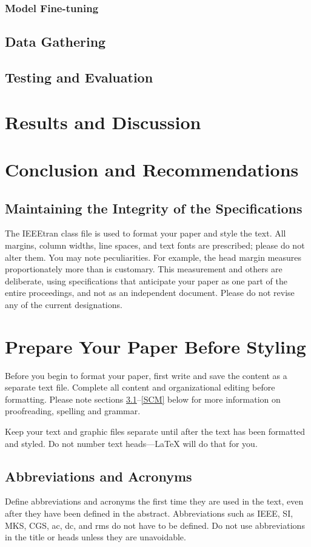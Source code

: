 \documentclass[conference]{IEEEtran}
\begin{document}
        \subsubsection{Model Fine-tuning}
    \subsection{Data Gathering}
    \subsection{Testing and Evaluation}

\section{Results and Discussion}
\section{Conclusion and Recommendations}

\subsection{Maintaining the Integrity of the Specifications}

The IEEEtran class file is used to format your paper and style the text. All margins, 
column widths, line spaces, and text fonts are prescribed; please do not 
alter them. You may note peculiarities. For example, the head margin
measures proportionately more than is customary. This measurement 
and others are deliberate, using specifications that anticipate your paper 
as one part of the entire proceedings, and not as an independent document. 
Please do not revise any of the current designations.

\section{Prepare Your Paper Before Styling}
Before you begin to format your paper, first write and save the content as a 
separate text file. Complete all content and organizational editing before 
formatting. Please note sections \ref{AA}--\ref{SCM} below for more information on 
proofreading, spelling and grammar.

Keep your text and graphic files separate until after the text has been 
formatted and styled. Do not number text heads---{\LaTeX} will do that 
for you.

\subsection{Abbreviations and Acronyms}\label{AA}
Define abbreviations and acronyms the first time they are used in the text, 
even after they have been defined in the abstract. Abbreviations such as 
IEEE, SI, MKS, CGS, ac, dc, and rms do not have to be defined. Do not use 
abbreviations in the title or heads unless they are unavoidable.
\end{document}
